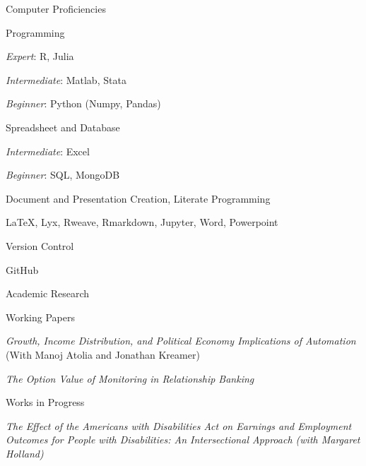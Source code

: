 \documentclass{resume} %
\begin{document}

\begin{rSection}{Computer Proficiencies}

\begin{rSubsection}{Programming}{}{}{}
    \item {\em Expert}: R, Julia
    \item {\em Intermediate}: Matlab, Stata 
    \item {\em Beginner}: Python (Numpy, Pandas)
\end{rSubsection}

\begin{rSubsection}{Spreadsheet and Database}{}{}{}
    \item {\em Intermediate}: Excel 
    \item {\em Beginner}: SQL, MongoDB
\end{rSubsection}

\begin{rSubsection}{Document and Presentation Creation, Literate Programming}{}{}{}
    \item \LaTeX, Lyx, Rweave, Rmarkdown, Jupyter, Word, Powerpoint
\end{rSubsection}

\newpage

\begin{rSubsection}{Version Control}{}{}{}
    \item GitHub
\end{rSubsection}

\end{rSection}

\begin{rSection}{Academic Research}

\begin{rSubsection}{Working Papers}{}{}{}
    \item {\em Growth, Income Distribution, and Political Economy Implications of Automation} (With Manoj Atolia and Jonathan Kreamer)
    \item {\em The Option Value of Monitoring in Relationship Banking}
\end{rSubsection}

\begin{rSubsection}{Works in Progress}{}{}{}
    \item {\em The Effect of the Americans with Disabilities Act on Earnings and Employment Outcomes for People with Disabilities: An Intersectional Approach (with Margaret Holland)}
\end{rSubsection}

\end{rSection}
\end{document}
